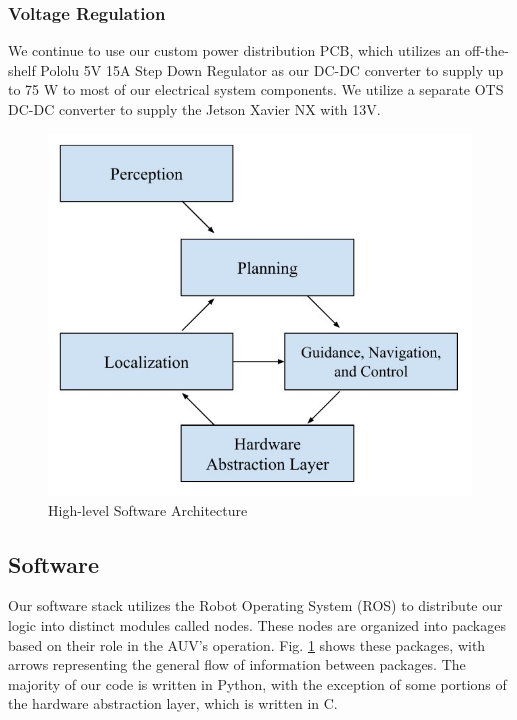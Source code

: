 \documentclass[conference]{IEEEtran}
\begin{document}
\subsubsection{Voltage Regulation}
\label{sssec:voltage_regulation}
We continue to use our custom power distribution PCB, which utilizes an off-the-shelf Pololu 5V 15A Step Down Regulator as our DC-DC converter to supply up to 75 W to most of our electrical system components. We utilize a separate OTS DC-DC converter to supply the Jetson Xavier NX with 13V.

\begin{figure}[htbp]
    \centerline{\includegraphics[scale=0.47]{images/ros_diagram.jpg}}
    \caption{High-level Software Architecture}
    \label{fig:ros}
\end{figure}
\subsection{Software}
\label{ssec:software}

Our software stack utilizes the Robot Operating System (ROS) to distribute our logic into distinct modules called nodes. These nodes are organized into packages based on their role in the AUV's operation. Fig. \ref{fig:ros} shows these packages, with arrows representing the general flow of information between packages. The majority of our code is written in Python, with the exception of some portions of the hardware abstraction layer, which is written in C. 
\end{document}
